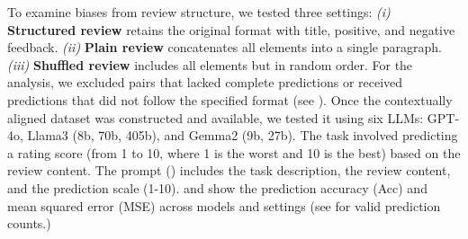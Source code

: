 




To examine biases from review structure, we tested three settings:
{\em (i)} \textbf{Structured review} retains the original format with title, positive, and negative feedback.
{\em (ii)} \textbf{Plain review} concatenates all elements into a single paragraph.
{\em (iii)} \textbf{Shuffled review} includes all elements but in random order.
For the analysis, we excluded pairs that lacked complete predictions or received predictions that did not follow the specified format (see ).
Once the contextually aligned dataset was constructed and available, we tested it using six LLMs: GPT-4o, Llama3 (8b, 70b, 405b), and Gemma2 (9b, 27b). 
The task involved predicting a rating score (from 1 to 10, where 1 is the worst and 10 is the best) based on the review content.
The prompt () includes the task description, the review content, and the prediction scale (1-10). 
 and  show the prediction accuracy (Acc) and mean squared error (MSE) across models and settings (see  for valid prediction counts.)




